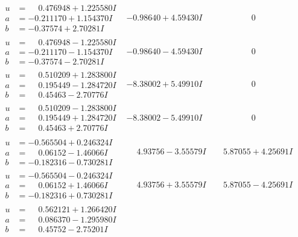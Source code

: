 \documentclass[1p]{elsarticle_modified}
\theoremstyle{definition}
\begin{document}
$$\begin{array}{c|c|c}
\begin{aligned}
u &= \phantom{-}0.476948 + 1.225580 I \\
a &= -0.211170 + 1.154370 I \\
b &= -0.37574 + 2.70281 I\end{aligned}
 & -0.98640 + 4.59430 I & \phantom{-0.000000 } 0 \\ \hline\begin{aligned}
u &= \phantom{-}0.476948 - 1.225580 I \\
a &= -0.211170 - 1.154370 I \\
b &= -0.37574 - 2.70281 I\end{aligned}
 & -0.98640 - 4.59430 I & \phantom{-0.000000 } 0 \\ \hline\begin{aligned}
u &= \phantom{-}0.510209 + 1.283800 I \\
a &= \phantom{-}0.195449 - 1.284720 I \\
b &= \phantom{-}0.45463 - 2.70776 I\end{aligned}
 & -8.38002 + 5.49910 I & \phantom{-0.000000 } 0 \\ \hline\begin{aligned}
u &= \phantom{-}0.510209 - 1.283800 I \\
a &= \phantom{-}0.195449 + 1.284720 I \\
b &= \phantom{-}0.45463 + 2.70776 I\end{aligned}
 & -8.38002 - 5.49910 I & \phantom{-0.000000 } 0 \\ \hline\begin{aligned}
u &= -0.565504 + 0.246324 I \\
a &= \phantom{-}0.06152 - 1.46066 I \\
b &= -0.182316 - 0.730281 I\end{aligned}
 & \phantom{-}4.93756 - 3.55579 I & \phantom{-}5.87055 + 4.25691 I \\ \hline\begin{aligned}
u &= -0.565504 - 0.246324 I \\
a &= \phantom{-}0.06152 + 1.46066 I \\
b &= -0.182316 + 0.730281 I\end{aligned}
 & \phantom{-}4.93756 + 3.55579 I & \phantom{-}5.87055 - 4.25691 I \\ \hline\begin{aligned}
u &= \phantom{-}0.562121 + 1.266420 I \\
a &= \phantom{-}0.086370 - 1.295980 I \\
b &= \phantom{-}0.45752 - 2.75201 I\end{aligned}

\end{array}$$
\end{document}
